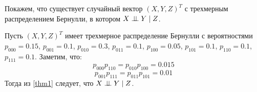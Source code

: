 Покажем, что существует случайный вектор $(X,Y,Z)^T$ с трехмерным распределением Бернулли, в котором $X \perp\!\!\!\perp Y \mid Z$.
\begin{example}
    Пусть $(X,Y,Z)^T$ имеет трехмерное распределение Бернулли с вероятностями
    $p_{000}=0.15$, $p_{001}=0.1$, $p_{010}=0.3$, $p_{011}=0.1$, $p_{100}=0.05$, $p_{101}=0.1$,
    $p_{110}=0.1$, $p_{111}=0.1$.
    Заметим, что:
    $$p_{000}p_{110}=p_{010}p_{100}=0.015$$ $$p_{001}p_{111}=p_{011}p_{101}=0.01$$
    Тогда из \autoref{thm1} следует, что $X \perp\!\!\!\perp Y \mid Z$.
\end{example}
